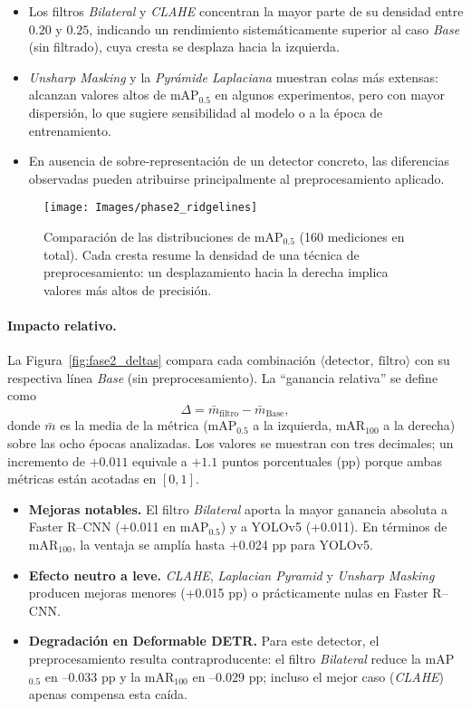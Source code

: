\begin{itemize}
  \item Los filtros \textit{Bilateral} y \textit{CLAHE} concentran la mayor parte de su densidad entre \(0.20\) y \(0.25\), indicando un rendimiento sistemáticamente superior al caso \textit{Base} (sin filtrado), cuya cresta se desplaza hacia la izquierda.
  \item \textit{Unsharp Masking} y la \textit{Pyrámide Laplaciana} muestran colas más extensas: alcanzan valores altos de mAP\(_{0.5}\) en algunos experimentos, pero con mayor dispersión, lo que sugiere sensibilidad al modelo o a la época de entrenamiento.
  \item En ausencia de sobre-representación de un detector concreto, las diferencias observadas pueden atribuirse principalmente al preprocesamiento aplicado.
\end{itemize}

\begin{figure}[!ht]
  \centering
  \texttt{[image: Images/phase2\_ridgelines]}
  \caption[Distribución de mAP\(_{0.5}\) por técnica]{Comparación de las distribuciones de mAP\(_{0.5}\) (160 mediciones en total).
           Cada cresta resume la densidad de una técnica de preprocesamiento: un desplazamiento hacia la derecha implica valores más altos de precisión.}
  \label{fig:fase2_ridges}
\end{figure}

\paragraph{Impacto relativo.}
La Figura~\ref{fig:fase2_deltas} compara cada combinación \(\langle\text{detector},\ \text{filtro}\rangle\) con su respectiva línea \textit{Base} (sin preprocesamiento).
La “ganancia relativa” se define como
\[
  \Delta = \bar{m}_{\text{filtro}} - \bar{m}_{\text{Base}},
\]
donde \(\bar{m}\) es la media de la métrica (mAP\(_{0.5}\) a la izquierda, mAR\(_{100}\) a la derecha) sobre las ocho épocas analizadas.
Los valores se muestran con tres decimales; un incremento de \(+0.011\) equivale a \(+1.1\) puntos porcentuales (pp) porque ambas métricas están acotadas en \([0,1]\).

\begin{itemize}
  \item \textbf{Mejoras notables.}
        El filtro \emph{Bilateral} aporta la mayor ganancia absoluta a Faster R–CNN (+0.011 en mAP\(_{0.5}\)) y a YOLOv5 (+0.011).
        En términos de mAR\(_{100}\), la ventaja se amplía hasta +0.024 pp para YOLOv5.
  \item \textbf{Efecto neutro a leve.}
        \emph{CLAHE}, \emph{Laplacian Pyramid} y \emph{Unsharp Masking} producen mejoras menores (+0.015 pp) o prácticamente nulas en Faster R–CNN.
  \item \textbf{Degradación en Deformable DETR.}
        Para este detector, el preprocesamiento resulta contraproducente: el filtro \emph{Bilateral} reduce la mAP\(_{0.5}\) en –0.033 pp y la mAR\(_{100}\) en –0.029 pp; incluso el mejor caso (\emph{CLAHE}) apenas compensa esta caída.
\end{itemize}

